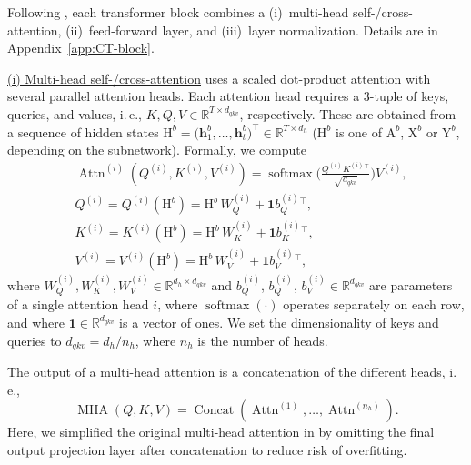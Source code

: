 \documentclass{article}
\newcommand\ie{i.\,e.\xspace}
\theoremstyle{plain}
\theoremstyle{definition}
\theoremstyle{remark}
\begin{document}
Following \cite{dong2021attention,lu2021pretrained}, each transformer block combines a (i)~multi-head self-/cross-attention, (ii)~feed-forward layer, and (iii)~layer normalization. Details are in Appendix~\ref{app:CT-block}.  

\underline{(i) Multi-head self-/cross-attention} uses a scaled dot-product attention with several parallel attention heads. Each attention head requires a 3-tuple of keys, queries, and values, \ie, $K, Q, V \in \mathbb{R}^{T \times d_{qkv}}$, respectively. These are obtained from a sequence of hidden states  $\mathrm{H}^b = \big(\mathbf{h}_1^b, \dots, \mathbf{h}_t^b\big)^\top \in \mathbb{R}^{T \times d_h}$ ($\mathrm{H}^b$ is one of $\mathrm{A}^b$, $\mathrm{X}^b$ or $\mathrm{Y}^b$, depending on the subnetwork). Formally, we compute
\begin{align}
        & \operatorname{Attn}^{(i)}(Q^{(i)}, K^{(i)}, V^{(i)}) =  \operatorname{softmax}\Big(\frac{Q^{(i)}K^{(i)}{}^\top}{\sqrt{d_{qkv}}}\Big) V^{(i)} , \label{eq:attention}
    \\
        & Q^{(i)} = Q^{(i)}(\mathrm{H}^b) = \mathrm{H}^b \, W_Q^{(i)} + \mathbf{1} b_Q^{(i)}{}^\top , \\
        & K^{(i)} = K^{(i)}(\mathrm{H}^b) = \mathrm{H}^b \, W_K^{(i)} + \mathbf{1} b^{(i)}_K{}^\top , \\ 
        & V^{(i)} = V^{(i)}(\mathrm{H}^b) = \mathrm{H}^b \, W_V^{(i)} + \mathbf{1} b_V^{(i)}{}^\top ,
\end{align}
where $W_Q^{(i)}, W_K^{(i)}, W_V^{(i)} \in \mathbb{R}^{d_h \times d_{qkv}}$ and $b_Q^{(i)}$, $b_Q^{(i)}$, $b_V^{(i)} \in \mathbb{R}^{d_{qkv}}$ are parameters of a single attention head $i$, where $\operatorname{softmax}(\cdot)$ operates separately on each row, and where $\mathbf{1} \in \mathbb{R}^{d_{qkv}}$ is a vector of ones. We set the dimensionality of keys and queries to $d_{qkv} = d_{h} / n_h$, where $n_h$ is the number of heads.

The output of a multi-head attention is a concatenation of the different heads, \ie, 
\begin{equation}
    \operatorname{MHA}(Q, K, V) = \operatorname{Concat}(\operatorname{Attn}^{(1)}, \dots, \operatorname{Attn}^{(n_h)}) .
\end{equation}
Here, we simplified the original multi-head attention in \cite{vaswani2017attention} by omitting the final output projection layer after concatenation to reduce risk of overfitting.
\end{document}
